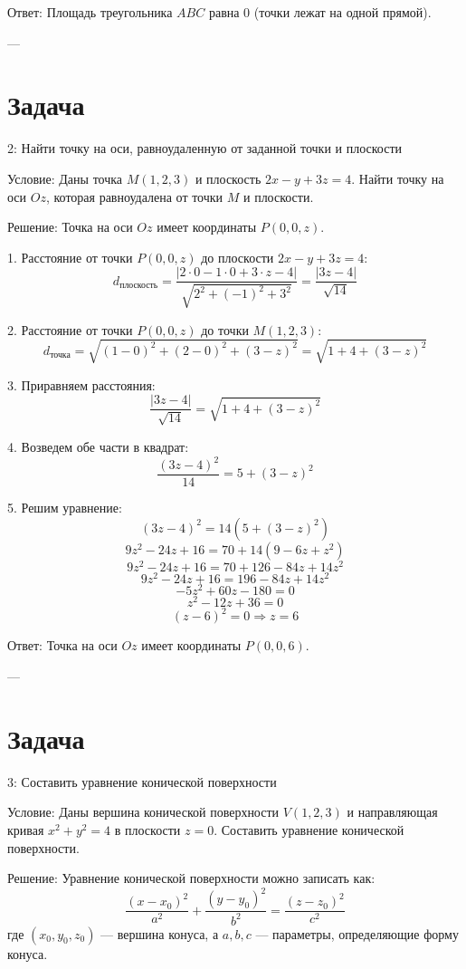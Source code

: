 \documentclass[a4paper,14pt]{extreport} %
\begin{document}
 Ответ:   
Площадь треугольника \( ABC \) равна 0 (точки лежат на одной прямой).

---

    \section*{Задача}2: Найти точку на оси, равноудаленную от заданной точки и плоскости

 Условие:   
Даны точка \( M(1, 2, 3) \) и плоскость \( 2x - y + 3z = 4 \).  
Найти точку на оси \( Oz \), которая равноудалена от точки \( M \) и плоскости.

 Решение:   
Точка на оси \( Oz \) имеет координаты \( P(0, 0, z) \).

1. Расстояние от точки \( P(0, 0, z) \) до плоскости \( 2x - y + 3z = 4 \):
   \[
   d_{\text{плоскость}} = \frac{|2 \cdot 0 - 1 \cdot 0 + 3 \cdot z - 4|}{\sqrt{2^2 + (-1)^2 + 3^2}} = \frac{|3z - 4|}{\sqrt{14}}
   \]

2. Расстояние от точки \( P(0, 0, z) \) до точки \( M(1, 2, 3) \):
   \[
   d_{\text{точка}} = \sqrt{(1-0)^2 + (2-0)^2 + (3-z)^2} = \sqrt{1 + 4 + (3-z)^2}
   \]

3. Приравняем расстояния:
   \[
   \frac{|3z - 4|}{\sqrt{14}} = \sqrt{1 + 4 + (3-z)^2}
   \]

4. Возведем обе части в квадрат:
   \[
   \frac{(3z - 4)^2}{14} = 5 + (3 - z)^2
   \]

5. Решим уравнение:
   \[
   (3z - 4)^2 = 14(5 + (3 - z)^2)
   \]
   \[
   9z^2 - 24z + 16 = 70 + 14(9 - 6z + z^2)
   \]
   \[
   9z^2 - 24z + 16 = 70 + 126 - 84z + 14z^2
   \]
   \[
   9z^2 - 24z + 16 = 196 - 84z + 14z^2
   \]
   \[
   -5z^2 + 60z - 180 = 0
   \]
   \[
   z^2 - 12z + 36 = 0
   \]
   \[
   (z - 6)^2 = 0 \Rightarrow z = 6
   \]

 Ответ:   
Точка на оси \( Oz \) имеет координаты \( P(0, 0, 6) \).

---

    \section*{Задача}3: Составить уравнение конической поверхности

 Условие:   
Даны вершина конической поверхности \( V(1, 2, 3) \) и направляющая кривая \( x^2 + y^2 = 4 \) в плоскости \( z = 0 \).  
Составить уравнение конической поверхности.

 Решение:   
Уравнение конической поверхности можно записать как:
\[
\frac{(x - x_0)^2}{a^2} + \frac{(y - y_0)^2}{b^2} = \frac{(z - z_0)^2}{c^2}
\]
где \( (x_0, y_0, z_0) \) — вершина конуса, а \( a, b, c \) — параметры, определяющие форму конуса.
\end{document}
